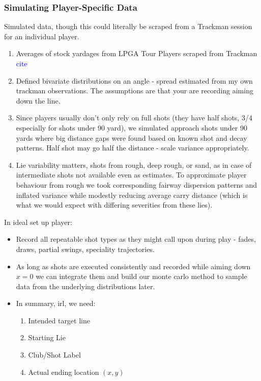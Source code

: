 \documentclass[11pt, letterpaper]{article}
\begin{document}
\subsubsection{Simulating Player-Specific Data}
Simulated data, though this could literally be scraped from a Trackman session for an individual player.
\begin{enumerate}
    \item Averages of stock yardages from LPGA Tour Players scraped from Trackman \textcolor{blue}{cite}
    \item Defined bivariate distributions on an angle - spread estimated from my own trackman observations. The assumptions are that your are recording aiming down the line.
    \item Since players usually don't only rely on full shots (they have half shots, 3/4 especially for shots under 90 yard), we simulated approach shots under 90 yards where big distance gaps were found based on known shot and decay patterns. Half shot may go half the distance - scale variance appropriately.
    \item Lie variability matters, shots from rough, deep rough, or sand, as in case of intermediate shots not available even as estimates. To approximate player behaviour from rough we took corresponding fairway dispersion patterns and inflated variance while modestly reducing average carry distance (which is what we would expect with differing severities from these lies).
\end{enumerate}

In ideal set up player:
\begin{itemize}
    \item Record all repeatable shot types as they might call upon during play - fades, draws, partial swings, speciality trajectories. 
    \item As long as shots are executed consistently and recorded while aiming down $x = 0$ we can integrate them and build our monte carlo method to sample data from the underlying distributions later.
    \item In summary, irl, we need:
    \begin{enumerate}
        \item Intended target line
        \item Starting Lie
        \item Club/Shot Label
        \item Actual ending location $(x,y)$
    \end{enumerate}
\end{itemize}
\end{document}

